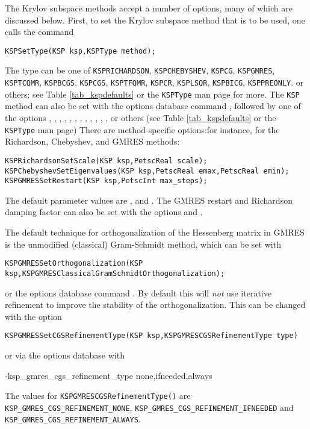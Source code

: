 The Krylov subspace methods accept a number of options, many of which
are discussed below.  First, to set the Krylov subspace method that is to
be used, one calls the command
\begin{lstlisting}
KSPSetType(KSP ksp,KSPType method);
\end{lstlisting}
The type can be one of \lstinline{KSPRICHARDSON}, \lstinline{KSPCHEBYSHEV}, \lstinline{KSPCG}, \lstinline{KSPGMRES},
\lstinline{KSPTCQMR}, \lstinline{KSPBCGS}, \lstinline{KSPCGS}, \lstinline{KSPTFQMR}, \lstinline{KSPCR}, \lstinline{KSPLSQR}, \lstinline{KSPBICG}, \lstinline{KSPPREONLY}. or others; see Table \ref{tab_kspdefaults} or the \lstinline{KSPType} man page for more. 
The \lstinline{KSP} method can also be set with the options database command
,
followed by one of the options , , , , ,
, , , , , , , or others (see Table \ref{tab_kspdefaults} or the \lstinline{KSPType} man page) 
There are method-specific options:for instance, for the Richardson, Chebyshev,
and GMRES methods:  
\begin{lstlisting}
KSPRichardsonSetScale(KSP ksp,PetscReal scale);
KSPChebyshevSetEigenvalues(KSP ksp,PetscReal emax,PetscReal emin);
KSPGMRESSetRestart(KSP ksp,PetscInt max_steps);
\end{lstlisting}
The default parameter values are , and . The GMRES
 restart and Richardson damping factor
can also be set with the options 
and . 

The default technique for orthogonalization of the Hessenberg
matrix in GMRES is the
unmodified (classical) Gram-Schmidt method, which can be set 
with
\begin{lstlisting}
KSPGMRESSetOrthogonalization(KSP ksp,KSPGMRESClassicalGramSchmidtOrthogonalization);
\end{lstlisting}
or the options database 
command .
By default this will {\em not} use iterative refinement to improve the
stability of the orthogonalization.
This can be changed with the option
\begin{lstlisting}
KSPGMRESSetCGSRefinementType(KSP ksp,KSPGMRESCGSRefinementType type)
\end{lstlisting}
or via the options database with
\begin{bashlisting}
-ksp_gmres_cgs_refinement_type none,ifneeded,always
\end{bashlisting}
The values for \lstinline{KSPGMRESCGSRefinementType()} are \lstinline{KSP_GMRES_CGS_REFINEMENT_NONE},  \break
\lstinline{KSP_GMRES_CGS_REFINEMENT_IFNEEDED} and \lstinline{KSP_GMRES_CGS_REFINEMENT_ALWAYS}.
 

